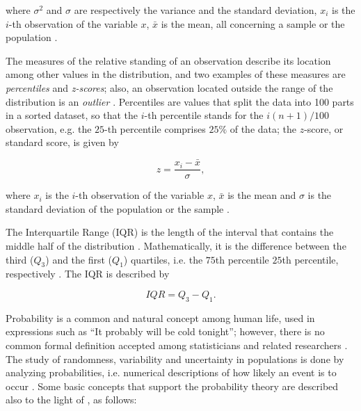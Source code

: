 \noindent where $\sigma^{2}$ and $\sigma$ are respectively the variance and the standard deviation, $x_{i}$ is the $i$-th observation of the variable $x$, $\bar{x}$ is the mean, all concerning a sample or the population \cite{zwillinger1999crc}.


The measures of the relative standing of an observation describe its location among other values in the distribution, and two examples of these measures are \emph{percentiles} and \emph{z-scores}; also, an observation located outside the range of the distribution is an \emph{outlier} \cite{mendenhall2016statistics}. Percentiles are values that split the data into 100 parts in a sorted dataset, so that the $i$-th percentile stands for the $i(n + 1) / 100$ observation, e.g. the $25$-th percentile comprises $25\%$ of the data; the $z$-score, or standard score, is given by

\begin{equation}
\label{eqn:z_score}
z = \frac{x_{i} - \bar{x}}{\sigma},
\end{equation}

\noindent where $x_{i}$ is the $i$-th observation of the variable $x$, $\bar{x}$ is the mean and $\sigma$ is the standard deviation of the population or the sample \cite{zwillinger1999crc}. 

The Interquartile Range (IQR) is the length of the interval that contains the middle half of the distribution \cite{degroot2012probability}. Mathematically, it is the difference between the third ($Q_{3}$) and the first ($Q_{1}$) quartiles, i.e. the $75$th percentile $25$th percentile, respectively \cite{devore2011probability}. The IQR is described by

\begin{equation}
\label{eqn:iqr}
IQR = Q_{3} - Q_{1}.
\end{equation}


Probability is a common and natural concept among human life, used in expressions such as ``It probably will be cold tonight''; however, there is no common formal definition accepted among statisticians and related researchers \cite{degroot2012probability}. The study of randomness, variability and uncertainty in populations is done by analyzing probabilities, i.e. numerical descriptions of how likely an event is to occur \cite{devore2011probability}. Some basic concepts that support the probability theory are described also to the light of , as follows:

